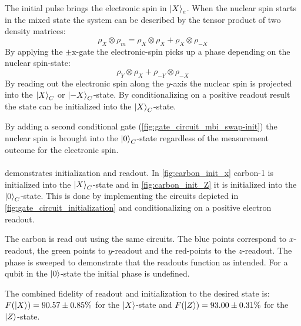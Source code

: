The initial pulse brings the electronic spin in ${\left\vert{X}\right\rangle}_e$.
When the nuclear spin starts in the mixed state the system can be described by the tensor product of two density matrices:
\begin{equation}
    \rho_X \otimes \rho_m = \rho_X \otimes \rho_{X} +\rho_X \otimes \rho_{-X}
\end{equation}
By applying the $\pm{\mathrm{x}}$-gate  the electronic-spin picks up a phase depending on the nuclear spin-state:
\begin{equation}
     \rho_Y \otimes \rho_{X} +\rho_{-Y} \otimes \rho_{-X}
\end{equation}
By reading out the electronic spin along the $y$-axis the nuclear spin is projected into the ${\left\vert{X}\right\rangle}_C$ or ${\left\vert{-X}\right\rangle}_C$-state.
By conditionalizing on a positive readout result the state can be initialized into the ${\left\vert{X}\right\rangle}_C$-state.

By adding a second conditional gate (\cref{fig:gate_circuit_mbi_swap-init}) the nuclear spin is brought into the ${\left\vert{0}\right\rangle}_C$-state regardless of the measurement outcome for the electronic spin.

\paragraph{}
 demonstrates initialization and readout.
In \cref{fig:carbon_init_x} carbon-1 is initialized into the ${\left\vert{X}\right\rangle}_C$-state and in \cref{fig:carbon_init_Z} it is initialized into the ${\left\vert{0}\right\rangle}_C$-state.
This is done by implementing the circuits depicted in \cref{fig:gate_circuit_initialization} and conditionalizing on a positive electron readout.

The carbon is read out using the same circuits.
The blue points correspond to $x$-readout, the green points to $y$-readout and the red-points to the $z$-readout.
The phase is sweeped to demonstrate that the readouts function as intended.
For a qubit in the ${\left\vert{0}\right\rangle}$-state the initial phase is undefined.

The combined fidelity of readout and initialization to the desired state is: $F({\left\vert{X}\right\rangle}) = 90.57 \pm 0.85 \% $ for the ${\left\vert{X}\right\rangle}$-state and $F({\left\vert{Z}\right\rangle}) = 93.00 \pm 0.31 \%$ for the ${\left\vert{Z}\right\rangle}$-state.

